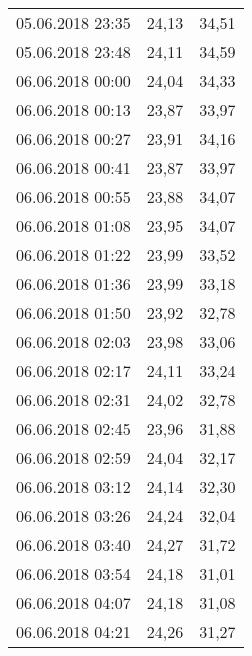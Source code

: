 \documentclass[a4paper,11pt,twoside]{article}
\begin{document}
\begin{longtable}[c]{ccc}
05.06.2018 23:35       & 24,13                & 34,51                          \\
05.06.2018 23:48       & 24,11                & 34,59                          \\
06.06.2018 00:00       & 24,04                & 34,33                          \\
06.06.2018 00:13       & 23,87                & 33,97                          \\
06.06.2018 00:27       & 23,91                & 34,16                          \\
06.06.2018 00:41       & 23,87                & 33,97                          \\
06.06.2018 00:55       & 23,88                & 34,07                          \\
06.06.2018 01:08       & 23,95                & 34,07                          \\
06.06.2018 01:22       & 23,99                & 33,52                          \\
06.06.2018 01:36       & 23,99                & 33,18                          \\
06.06.2018 01:50       & 23,92                & 32,78                          \\
06.06.2018 02:03       & 23,98                & 33,06                          \\
06.06.2018 02:17       & 24,11                & 33,24                          \\
06.06.2018 02:31       & 24,02                & 32,78                          \\
06.06.2018 02:45       & 23,96                & 31,88                          \\
06.06.2018 02:59       & 24,04                & 32,17                          \\
06.06.2018 03:12       & 24,14                & 32,30                          \\
06.06.2018 03:26       & 24,24                & 32,04                          \\
06.06.2018 03:40       & 24,27                & 31,72                          \\
06.06.2018 03:54       & 24,18                & 31,01                          \\
06.06.2018 04:07       & 24,18                & 31,08                          \\
06.06.2018 04:21       & 24,26                & 31,27                          \\

\end{longtable}
\end{document}
